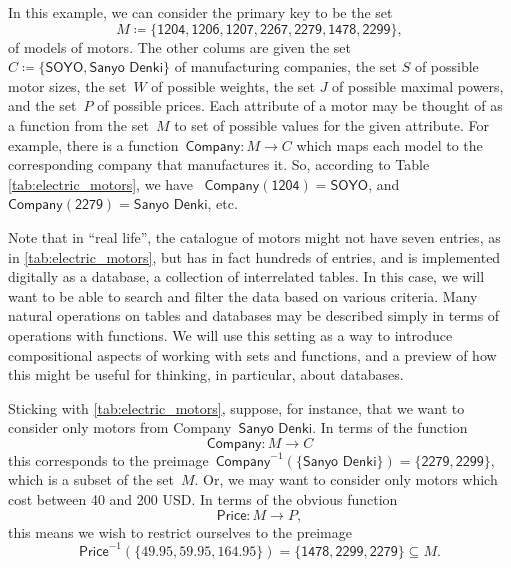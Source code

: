 In this example, we can consider the primary key to be the set
\begin{equation*}
M \coloneqq \{ \textsf{1204}, \textsf{1206}, \textsf{1207}, \textsf{2267}, \textsf{2279}, \textsf{1478}, \textsf{2299} \},
\end{equation*}
of models of motors. The other colums are given the set~$C \coloneqq \{ \textsf{SOYO}, \textsf{Sanyo Denki}\}$ of manufacturing companies, the set $S$ of possible motor sizes, the set~$W$ of possible weights, the set $J$ of possible maximal powers, and the set~$P$ of possible prices. Each attribute of a motor may be thought of as a function from the set~$M$ to set of possible values for the given attribute. For example, there is a function~$\textsf{Company}\colon M \to C$ which maps each model to the corresponding company that manufactures it. So, according to Table \ref{tab:electric_motors}, we have ~$\textsf{Company}(\textsf{1204}) = \textsf{SOYO}$, and~$\textsf{Company}(\textsf{2279}) = \textsf{Sanyo Denki}$, etc.

Note that in ``real life'', the catalogue of motors might not have seven entries, as in \cref{tab:electric_motors}, but has in fact hundreds of entries, and is implemented digitally as a database,  a collection of interrelated tables. In this case, we will want to be able to search and filter the data based on various criteria. Many natural operations on tables and databases may be described simply in terms of operations with functions. We will use this setting as a way to introduce compositional aspects of working with sets and functions, and a preview of how this might be useful for thinking, in particular, about databases.

Sticking with \cref{tab:electric_motors}, suppose, for instance, that we want to consider only motors from Company~$\textsf{Sanyo Denki}$. In terms of the function
\begin{equation*}
\textsf{Company}\colon M \to C
\end{equation*}
this corresponds to the preimage~$\textsf{Company}^{-1}(\{ \textsf{Sanyo Denki} \}) = \{ \textsf{2279}, \textsf{2299}\}$, which is a subset of the set~$M$. Or, we may want to consider only motors which cost between 40 and 200 USD. In terms of the obvious function
\begin{equation*}
\textsf{Price}\colon M \to P,
\end{equation*}
this means we wish to restrict ourselves to the preimage
\begin{equation*}
\textsf{Price}^{-1}(\{ 49.95, 59.95, 164.95\}) = \{ \textsf{1478}, \textsf{2299}, \textsf{2279} \} \subseteq M.
\end{equation*}

